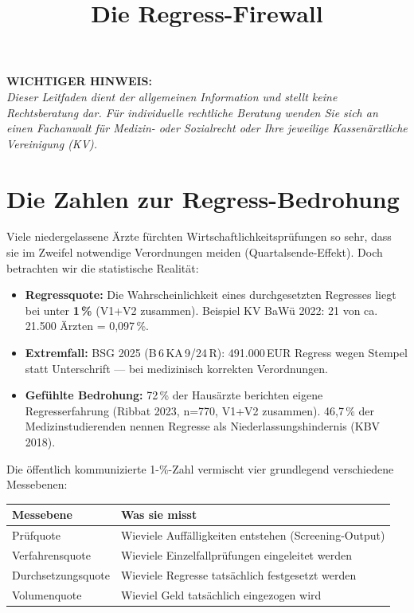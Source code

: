 \documentclass[a4paper]{umbruch-position}
\title{Die Regress-Firewall}
\begin{document}
\maketitle

\begin{infobox}
\textbf{WICHTIGER HINWEIS:}\\
\textit{Dieser Leitfaden dient der allgemeinen Information und stellt keine Rechtsberatung dar. F\"ur individuelle rechtliche Beratung wenden Sie sich an einen Fachanwalt f\"ur Medizin- oder Sozialrecht oder Ihre jeweilige Kassen\"arztliche Vereinigung (KV).}
\end{infobox}

\section{Die Zahlen zur Regress-Bedrohung}

Viele niedergelassene \"Arzte f\"urchten Wirtschaftlichkeitspr\"ufungen so sehr, dass sie im Zweifel notwendige Verordnungen meiden (Quartalsende-Effekt). Doch betrachten wir die statistische Realit\"at:

\begin{itemize}
    \item \textbf{Regressquote:} Die Wahrscheinlichkeit eines durchgesetzten Regresses liegt bei unter \textbf{1\,\%} (V1+V2 zusammen). Beispiel KV BaW\"u 2022: 21 von ca. 21.500 \"Arzten = 0,097\,\%.
    \item \textbf{Extremfall:} BSG 2025 (B\,6\,KA\,9/24\,R): 491.000\,EUR Regress wegen Stempel statt Unterschrift --- bei medizinisch korrekten Verordnungen.
    \item \textbf{Gef\"uhlte Bedrohung:} 72\,\% der Haus\"arzte berichten eigene Regresserfahrung (Ribbat 2023, n=770, V1+V2 zusammen). 46,7\,\% der Medizinstudierenden nennen Regresse als Niederlassungshindernis (KBV 2018).
\end{itemize}

Die \"offentlich kommunizierte 1-\%-Zahl vermischt vier grundlegend verschiedene Messebenen:

\begin{center}
{\small
\begin{tabular}{p{3.5cm} p{7cm}}
\toprule
\textbf{Messebene} & \textbf{Was sie misst} \\
\midrule
Pr\"ufquote & Wieviele Auff\"alligkeiten entstehen (Screening-Output) \\
Verfahrensquote & Wieviele Einzelfallpr\"ufungen eingeleitet werden \\
Durchsetzungsquote & Wieviele Regresse tats\"achlich festgesetzt werden \\
Volumenquote & Wieviel Geld tats\"achlich eingezogen wird \\
\bottomrule
\end{tabular}
}
\end{center}
\end{document}
